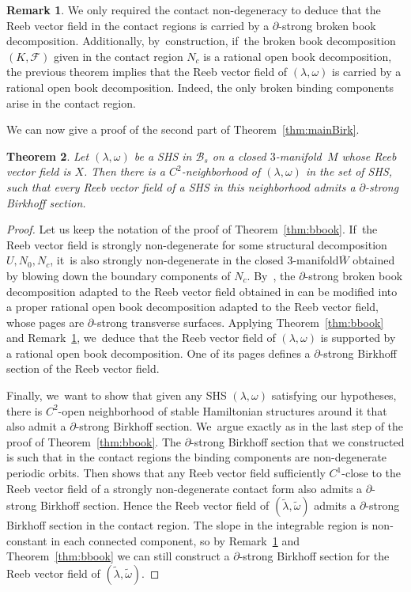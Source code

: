 \documentclass[10pt]{amsart}
\newcommand{\threemanifold}{$3$\nobreakdash-mani\-fold\xspace}
\newtheorem{theorem}{Theorem}[section]
\theoremstyle{definition}
\newtheorem{Remark}[theorem]{Remark}
\begin{document}
\begin{Remark} \label{rem:bbook}
We only required the contact non-degeneracy to deduce that the Reeb vector field in the contact regions is carried by a $\partial$-strong broken book decomposition. Additionally, by~construction, if~the broken book decomposition $(K,\mathcal{F})$ given in the contact region $N_c$ is a rational open book decomposition, the previous theorem implies that the Reeb vector field of $(\lambda,\omega)$ is carried by a rational open book decomposition. Indeed, the only broken binding components arise in the contact region.
\end{Remark}

We can now give a proof of the second part of Theorem~\ref{thm:mainBirk}.

\begin{theorem}\label{thm:Bsection}
Let $(\lambda,\omega)$ be a SHS in $\mathcal{B}_s$ on a closed \threemanifold~$M$ whose Reeb vector field is $X$.
Then there is a $C^2$-neighborhood of $(\lambda,\omega)$ in the set of SHS, such that every Reeb vector field of a SHS in this neighborhood admits a $\partial$-strong Birkhoff section.
\end{theorem}

\begin{proof}
Let us keep the notation of the proof of Theorem~\ref{thm:bbook}. If~the Reeb vector field is strongly non-degenerate for some structural decomposition $U, N_0, N_c$, it~is also strongly non-degenerate in the closed \threemanifold $\overline W$ obtained by blowing down the boundary components of $N_c$. By~\cite[Th.\,A]{CM}, the $\partial$-strong broken book decomposition adapted to the Reeb vector field obtained in \cite[Th.\,1.1]{CDR} can be modified into a proper rational open book decomposition adapted to the Reeb vector field, whose pages are $\partial$-strong transverse surfaces. Applying Theorem~\ref{thm:bbook} and Remark~\ref{rem:bbook}, we~deduce that the Reeb vector field of $(\lambda,\omega)$ is supported by a rational open book decomposition. One of its pages defines a $\partial$-strong Birkhoff section of the Reeb vector field.

Finally, we~want to show that given any SHS $(\lambda,\omega)$ satisfying our hypotheses, there is $C^2$-open neighborhood of stable Hamiltonian structures around it that also admit a $\partial$-strong Birkhoff section. We~argue exactly as in the last step of the proof of Theorem~\ref{thm:bbook}. The $\partial$-strong Birkhoff section that we constructed is such that in the contact regions the binding components are non-degenerate periodic orbits. Then \cite[Prop.\,5.1]{CDHR} shows that any Reeb vector field sufficiently $C^1$-close to the Reeb vector field of a strongly non-degenerate contact form also admits a $\partial$-strong Birkhoff section. Hence the Reeb vector field of
$(\widetilde \lambda, \widetilde \omega)$ admits a $\partial$-strong Birkhoff section in the contact region. The slope in the integrable region is non-constant in each connected component, so by Remark~\ref{rem:bbook} and Theorem~\ref{thm:bbook} we can still construct a $\partial$-strong Birkhoff section for the Reeb vector field of $(\widetilde \lambda, \widetilde \omega)$.
\end{proof}
\end{document}
